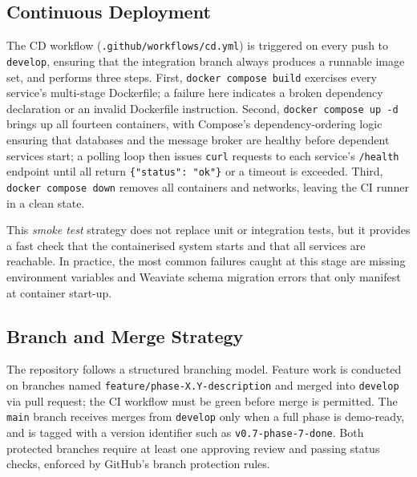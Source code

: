 \subsection{Continuous Deployment}

The CD workflow (\texttt{.github/workflows/cd.yml}) is triggered on every push to
\texttt{develop}, ensuring that the integration branch always produces a runnable image
set, and performs three steps.
First, \texttt{docker compose build} exercises every service's multi-stage Dockerfile;
a failure here indicates a broken dependency declaration or an invalid Dockerfile
instruction.
Second, \texttt{docker compose up -d} brings up all fourteen containers, with Compose's
dependency-ordering logic ensuring that databases and the message broker are healthy
before dependent services start; a polling loop then issues \texttt{curl} requests to
each service's \texttt{/health} endpoint until all return \texttt{\{"status": "ok"\}}
or a timeout is exceeded.
Third, \texttt{docker compose down} removes all containers and networks, leaving the CI
runner in a clean state.

This \emph{smoke test} strategy does not replace unit or integration tests, but
it provides a fast check that the containerised system starts and that all
services are reachable.  In practice, the most common failures caught at this
stage are missing environment variables and Weaviate schema migration errors
that only manifest at container start-up.

\subsection{Branch and Merge Strategy}

The repository follows a structured branching model.  Feature work is
conducted on branches named \texttt{feature/phase-X.Y-description} and merged
into \texttt{develop} via pull request; the CI workflow must be green before
merge is permitted.  The \texttt{main} branch receives merges from
\texttt{develop} only when a full phase is demo-ready, and is tagged with a
version identifier such as \texttt{v0.7-phase-7-done}.  Both protected
branches require at least one approving review and passing status checks,
enforced by GitHub's branch protection rules.
